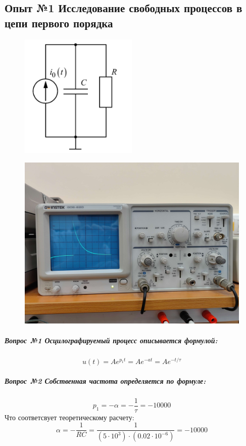 \documentclass[a4paper,12pt]{report}
\begin{document}
\begin{flushleft}
    \item\subsection*{Опыт №1 Исследование свободных процессов в цепи первого порядка}
    \item \begin{figure}[h!]
        \includegraphics[width=0.5\textwidth]{image.png}
        \label{ris:image1}
    \end{figure}

     \begin{figure}[h!]
      \includegraphics[width=1\textwidth]{graph1.jpg}
      \label{ris:image2}
  \end{figure}

  \subparagraph*{Вопрос №1 Осцилографируемый процесс описывается формулой:}
  \[ u(t) = Ae^{p_1t} = Ae^{-at} = Ae^{-t/\tau} \]
  \subparagraph*{Вопрос №2 Собственная частота определяется по формуле:}
  \[ p_1 = - \alpha = -\frac{1}{\tau} = -10000\]
  Что соответсвует теоретическому расчету:
  \[ \alpha = - \frac{1}{RC} = \frac{1}{(5\cdot 10^{3})\cdot (0.02\cdot 10^{-6})} = -10000 \]


\end{flushleft}
\end{document}
